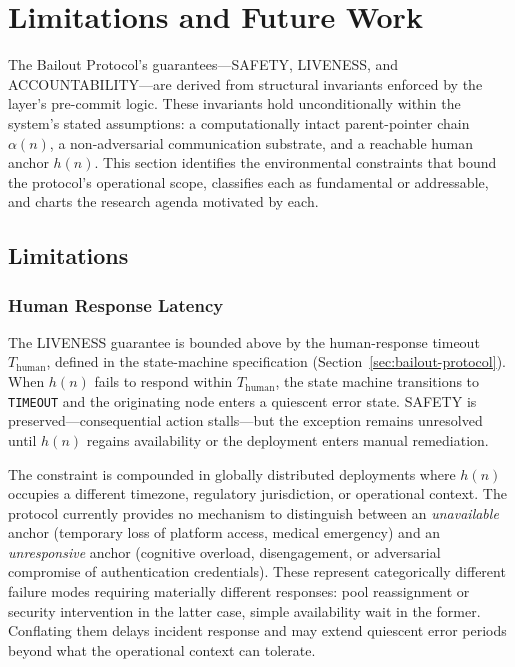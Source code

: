 \section{Limitations and Future Work}\label{sec:limitations}

The Bailout Protocol's guarantees---SAFETY, LIVENESS, and ACCOUNTABILITY---are derived from structural invariants enforced by the \fact{} layer's pre-commit logic. These invariants hold unconditionally within the system's stated assumptions: a computationally intact parent-pointer chain $\alpha(n)$, a non-adversarial communication substrate, and a reachable human anchor $h(n)$. This section identifies the environmental constraints that bound the protocol's operational scope, classifies each as fundamental or addressable, and charts the research agenda motivated by each.

\subsection{Limitations}\label{sec:limitations:items}

\subsubsection{Human Response Latency}
\label{sec:lim:latency}

The LIVENESS guarantee is bounded above by the human-response timeout $T_{\text{human}}$, defined in the state-machine specification (Section~\ref{sec:bailout-protocol}). When $h(n)$ fails to respond within $T_{\text{human}}$, the state machine transitions to \texttt{TIMEOUT} and the originating node enters a quiescent error state. SAFETY is preserved---consequential action stalls---but the exception remains unresolved until $h(n)$ regains availability or the deployment enters manual remediation.

The constraint is compounded in globally distributed deployments where $h(n)$ occupies a different timezone, regulatory jurisdiction, or operational context. The protocol currently provides no mechanism to distinguish between an \textit{unavailable} anchor (temporary loss of platform access, medical emergency) and an \textit{unresponsive} anchor (cognitive overload, disengagement, or adversarial compromise of authentication credentials). These represent categorically different failure modes requiring materially different responses: pool reassignment or security intervention in the latter case, simple availability wait in the former. Conflating them delays incident response and may extend quiescent error periods beyond what the operational context can tolerate.

